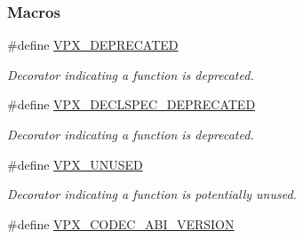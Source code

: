 \subsubsection*{Macros}
\begin{DoxyCompactItemize}
\item 
\#define \hyperlink{group__codec_gae3469452735ce633173b00024c97d556}{V\+P\+X\+\_\+\+D\+E\+P\+R\+E\+C\+A\+T\+ED}\hypertarget{group__codec_gae3469452735ce633173b00024c97d556}{}\label{group__codec_gae3469452735ce633173b00024c97d556}

\begin{DoxyCompactList}\small\item\em Decorator indicating a function is deprecated. \end{DoxyCompactList}\item 
\#define \hyperlink{group__codec_ga725e874689726a0df88873b93c50254e}{V\+P\+X\+\_\+\+D\+E\+C\+L\+S\+P\+E\+C\+\_\+\+D\+E\+P\+R\+E\+C\+A\+T\+ED}
\begin{DoxyCompactList}\small\item\em Decorator indicating a function is deprecated. \end{DoxyCompactList}\item 
\#define \hyperlink{group__codec_ga21537a8053ca3eb8f1b9f12c47f2883f}{V\+P\+X\+\_\+\+U\+N\+U\+S\+ED}\hypertarget{group__codec_ga21537a8053ca3eb8f1b9f12c47f2883f}{}\label{group__codec_ga21537a8053ca3eb8f1b9f12c47f2883f}

\begin{DoxyCompactList}\small\item\em Decorator indicating a function is potentially unused. \end{DoxyCompactList}\item 
\#define \hyperlink{group__codec_gaf7e9cad2df0f81679b881f46740ad097}{V\+P\+X\+\_\+\+C\+O\+D\+E\+C\+\_\+\+A\+B\+I\+\_\+\+V\+E\+R\+S\+I\+ON}\hypertarget{group__codec_gaf7e9cad2df0f81679b881f46740ad097}{}\label{group__codec_gaf7e9cad2df0f81679b881f46740ad097}


\end{DoxyCompactItemize}
